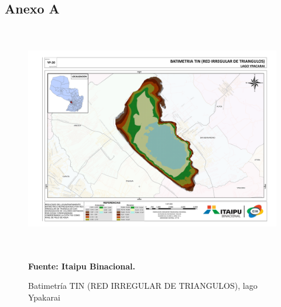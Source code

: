 \appendixpageoff
\begin{appendices}




\chapter*{Anexo A}

\begin{figure}[ht]
    \centering
    \includegraphics[width=150mm, height=100mm]{Imagenes/cap3/Batimetria_lago_Ypacarai_TIN_A3.pdf}
    \caption[BATIMETRIA TIN lago Ypakarai]{Batimetr\'ia TIN (RED IRREGULAR DE TRIANGULOS), lago Ypakarai} \textbf{Fuente:  Itaipu Binacional.}
    \label{fig:BatimetriaItaipu}
\end{figure}


\end{appendices}
